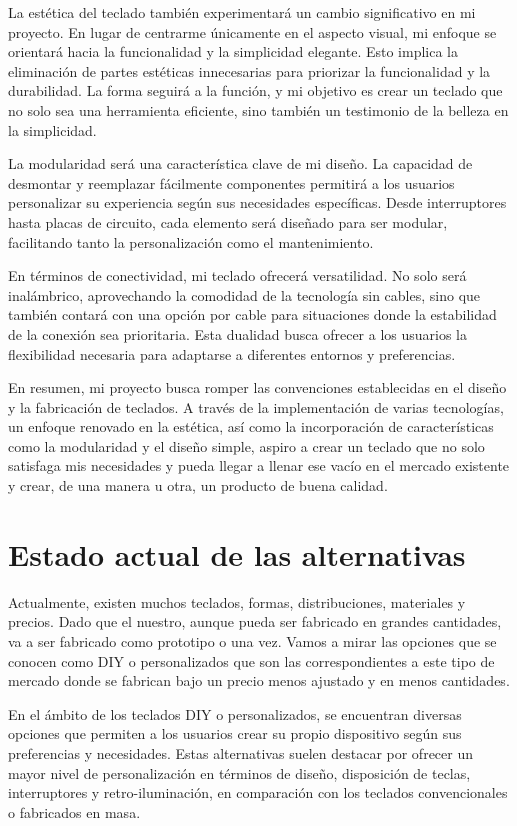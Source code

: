 La estética del teclado también experimentará un cambio significativo en mi proyecto. En lugar de centrarme únicamente en el aspecto visual, mi enfoque se orientará hacia la funcionalidad y la simplicidad elegante. Esto implica la eliminación de partes estéticas innecesarias para priorizar la funcionalidad y la durabilidad. La forma seguirá a la función, y mi objetivo es crear un teclado que no solo sea una herramienta eficiente, sino también un testimonio de la belleza en la simplicidad.

La modularidad será una característica clave de mi diseño. La capacidad de desmontar y reemplazar fácilmente componentes permitirá a los usuarios personalizar su experiencia según sus necesidades específicas. Desde interruptores hasta placas de circuito, cada elemento será diseñado para ser modular, facilitando tanto la personalización como el mantenimiento.

En términos de conectividad, mi teclado ofrecerá versatilidad. No solo será inalámbrico, aprovechando la comodidad de la tecnología sin cables, sino que también contará con una opción por cable para situaciones donde la estabilidad de la conexión sea prioritaria. Esta dualidad busca ofrecer a los usuarios la flexibilidad necesaria para adaptarse a diferentes entornos y preferencias.

En resumen, mi proyecto busca romper las convenciones establecidas en el diseño y la fabricación de teclados. A través de la implementación de varias tecnologías, un enfoque renovado en la estética, así como la incorporación de características como la modularidad y el diseño simple, aspiro a crear un teclado que no solo satisfaga mis necesidades y pueda llegar a llenar ese vacío en el mercado existente y crear, de una manera u otra, un producto de buena calidad.
\pagebreak

\section{Estado actual de las alternativas}
Actualmente, existen muchos teclados, formas, distribuciones, materiales y precios. \cite{cdw-keyboards} Dado que el nuestro, aunque pueda ser fabricado en grandes cantidades, va a ser fabricado como prototipo o una vez. Vamos a mirar las opciones que se conocen como \gls{DIY} o personalizados que son las correspondientes a este tipo de mercado donde se fabrican bajo un precio menos ajustado y en menos cantidades.

En el ámbito de los teclados \gls{DIY} o personalizados, se encuentran diversas opciones que permiten a los usuarios crear su propio dispositivo según sus preferencias y necesidades. Estas alternativas suelen destacar por ofrecer un mayor nivel de personalización en términos de diseño, disposición de teclas, interruptores y retro-iluminación, en comparación con los teclados convencionales o fabricados en masa. \cite{Diy-Keyboard-POPSC}

